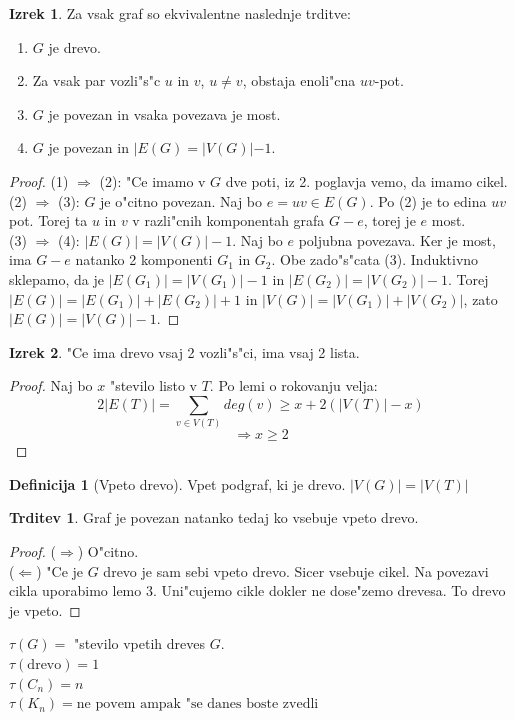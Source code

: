 \documentclass{article}
\theoremstyle{definition}
\newtheorem{definition}{Definicija}[section]
\newtheorem{claim}{Trditev}[section]
\newtheorem{theorem}{Izrek}[section]
\begin{document}
	\begin{theorem}
		Za vsak graf so ekvivalentne naslednje trditve:
		\begin{enumerate}
			\item $G$ je drevo.
			\item Za vsak par vozli"s"c $u$ in $v$, $u \neq v$, obstaja enoli"cna $uv$-pot.
			\item $G$ je povezan in vsaka povezava je most.
			\item $G$ je povezan in $|E(G) = |V(G)| - 1$.
		\end{enumerate}
		\begin{proof}
			(1) $\Rightarrow$ (2): "Ce imamo v $G$ dve poti, iz 2. poglavja vemo, da imamo cikel. \\
			(2) $\Rightarrow$ (3): $G$ je o"citno povezan. Naj bo $e = uv \in E(G)$. Po (2) je to edina $uv$ pot. Torej ta $u$ in $v$ v razli"cnih komponentah grafa $G-e$, torej je $e$ most. \\
			(3) $\Rightarrow$ (4): $|E(G)| = |V(G)|-1$. Naj bo $e$ poljubna povezava. Ker je most, ima $G-e$ natanko 2 komponenti $G_1$ in $G_2$. Obe zado"s"cata (3). Induktivno sklepamo, da je $|E(G_1)| = |V(G_1)|-1$ in $|E(G_2)| = |V(G_2)|-1$. Torej $|E(G)| = |E(G_1)| + |E(G_2)| + 1$ in $|V(G)| = |V(G_1)| + |V(G_2)|$, zato $|E(G)| = |V(G)| - 1$.
		\end{proof}
	\end{theorem}

	\begin{theorem}
		"Ce ima drevo vsaj 2 vozli"s"ci, ima vsaj 2 lista.
		\begin{proof}
			Naj bo $x$ "stevilo listo v $T$. Po lemi o rokovanju velja:
			$$ 2|E(T)| = \sum_{v \in V(T)}deg(v) \geq x + 2(|V(T)| - x) $$
			$$\Rightarrow x \geq 2$$
		\end{proof}
	\end{theorem}

	\begin{definition}[Vpeto drevo]
		Vpet podgraf, ki je drevo.
		$|V(G)| = |V(T)|$
	\end{definition}
	\begin{claim}
		Graf je povezan natanko tedaj ko vsebuje vpeto drevo.
		\begin{proof}
			($\Rightarrow$) O"citno. \\
			($\Leftarrow$) "Ce je $G$ drevo je sam sebi vpeto drevo. Sicer vsebuje cikel. Na povezavi cikla uporabimo lemo 3. Uni"cujemo cikle dokler ne dose"zemo drevesa. To drevo je vpeto.
		\end{proof}
	\end{claim}
	$\tau(G) = $ "stevilo vpetih dreves $G$. \\
	$\tau(\text{drevo}) = 1$ \\
	$\tau(C_n) = n$ \\
	$\tau(K_n) = \text{ne povem ampak "se danes boste zvedli }$ %
	
\end{document}
